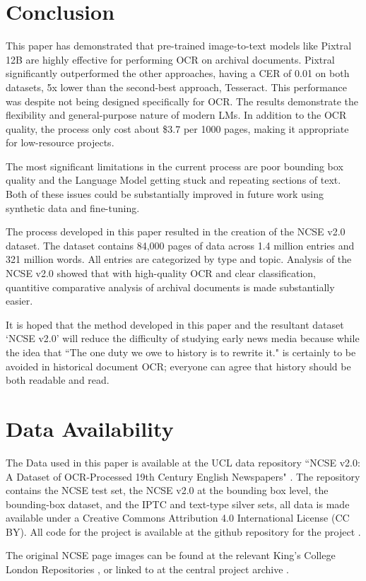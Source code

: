\documentclass{article} %
\begin{document}
\section{Conclusion}

This paper has demonstrated that pre-trained image-to-text models like Pixtral 12B are highly effective for performing OCR on archival documents. Pixtral significantly outperformed the other approaches, having a CER of 0.01 on both datasets, 5x lower than the second-best approach, Tesseract. This performance was despite not being designed specifically for OCR. The results demonstrate the flexibility and general-purpose nature of modern LMs. In addition to the OCR quality, the process only cost about \$3.7 per 1000 pages, making it appropriate for low-resource projects. 

The most significant limitations in the current process are poor bounding box quality and the Language Model getting stuck and repeating sections of text. Both of these issues could be substantially improved in future work using synthetic data and fine-tuning.

The process developed in this paper resulted in the creation of the NCSE v2.0 dataset. The dataset contains 84,000 pages of data across 1.4 million entries and 321 million words. All entries are categorized by type and topic. Analysis of the NCSE v2.0 showed that with high-quality OCR and clear classification, quantitive comparative analysis of archival documents is made substantially easier.

It is hoped that the method developed in this paper and the resultant dataset `NCSE v2.0' will reduce the difficulty of studying early news media because while the idea that ``The one duty we owe to history is to rewrite it." \cite{wilde_critic_1891} is certainly to be avoided in historical document OCR; everyone can agree that history should be both readable and read.

\section{Data Availability}

The Data used in this paper is available at the UCL data repository ``NCSE v2.0: A Dataset of OCR-Processed 19th Century English Newspapers" \cite{bourne_ncse_2025}. The repository contains the NCSE test set, the NCSE v2.0 at the bounding box level, the bounding-box dataset, and the IPTC and text-type silver sets, all data is made available under a Creative Commons Attribution 4.0 International License (CC BY).  All code for the project is available at the github repository for the project \cite{bourne_codebase_2025}.

The original NCSE page images can be found at the relevant King's College London Repositories \cite{turner_ncse_2024, turner_ncse_2024-1, turner_ncse_2024-2, turner_ncse_2024-3, turner_ncse_2024-4, turner_ncse_2024-5}, or linked to at the central project archive \cite{turner_nineteenth-century_2024}.

\printbibliography 
\end{document}
